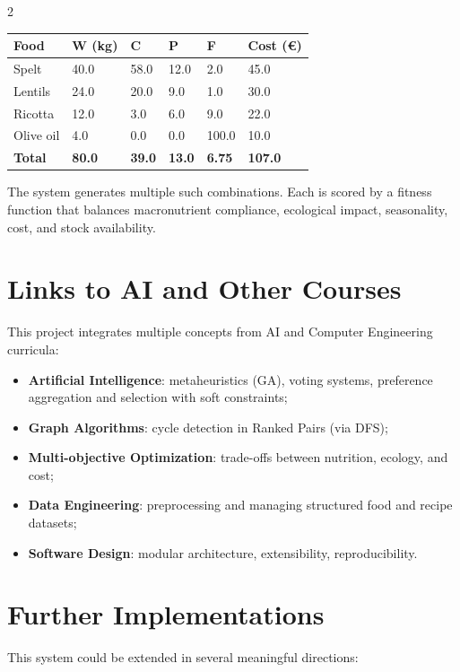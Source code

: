 \documentclass[10pt,a4paper]{article}
\begin{document}
\begin{multicols}{2}
\begin{center}
\begin{tabular}{@{} l l l l l l @{}} 
\toprule
\textbf{Food} & \textbf{W (kg)} & \textbf{C} & \textbf{P} & \textbf{F} & \textbf{Cost (€)} \\
\midrule
Spelt & 40.0 & 58.0 & 12.0 & 2.0 & 45.0 \\
Lentils & 24.0 & 20.0 & 9.0 & 1.0 & 30.0 \\
Ricotta & 12.0 & 3.0 & 6.0 & 9.0 & 22.0 \\
Olive oil & 4.0 & 0.0 & 0.0 & 100.0 & 10.0 \\
\midrule
\textbf{Total} & \textbf{80.0} & \textbf{39.0} & \textbf{13.0} & \textbf{6.75} & \textbf{107.0} \\
\bottomrule
\end{tabular}
\end{center}

The system generates multiple such combinations. Each is scored by a fitness function that balances macronutrient compliance, ecological impact, seasonality, cost, and stock availability.

\section{Links to AI and Other Courses}

This project integrates multiple concepts from AI and Computer Engineering curricula:
\begin{itemize}[leftmargin=*]
  \item \textbf{Artificial Intelligence}: metaheuristics (GA), voting systems, preference aggregation and selection with soft constraints;
  \item \textbf{Graph Algorithms}: cycle detection in Ranked Pairs (via DFS);
  \item \textbf{Multi-objective Optimization}: trade-offs between nutrition, ecology, and cost;
  \item \textbf{Data Engineering}: preprocessing and managing structured food and recipe datasets;
  \item \textbf{Software Design}: modular architecture, extensibility, reproducibility.
\end{itemize}

\section{Further Implementations}

This system could be extended in several meaningful directions:


\end{multicols}
\end{document}
